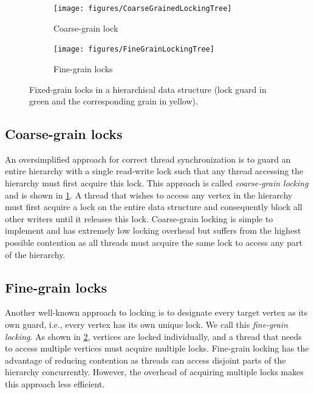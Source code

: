 \begin{figure}[H]
    \captionsetup{justification=centering}
    \centering
    \begin{subfigure}{.49\textwidth}
        \centering
        \texttt{[image: figures/CoarseGrainedLockingTree]}
        \caption{Coarse-grain lock}        
        \label{fig:fixedLockGrainsCoarse}
    \end{subfigure}
    \begin{subfigure}{.49\textwidth}
        \centering
        \texttt{[image: figures/FineGrainLockingTree]}
        \caption{Fine-grain locks}
        \label{fig:fixedLockGrainsFine}
    \end{subfigure}
    
    \label{fig:fixedLockGrains}
\caption{Fixed-grain locks in a hierarchical data structure (lock guard in green and the corresponding grain in yellow).}
\end{figure}


\subsection{Coarse-grain locks}
An oversimplified approach for correct thread synchronization is to guard an entire hierarchy with a single read-write lock such that any thread accessing the hierarchy must first acquire this lock.
This approach is called \emph{coarse-grain locking} and is shown in \cref{fig:fixedLockGrainsCoarse}.
A thread that wishes to access any vertex in the hierarchy must first acquire a lock on the entire data structure and consequently block all other writers until it releases this lock. 
Coarse-grain locking is simple to implement and has extremely low locking overhead but suffers from the highest possible contention as all threads must acquire the same lock to access any part of the hierarchy. 


\subsection{Fine-grain locks}
Another well-known approach to locking is to designate every target vertex as its own guard, i.e., every vertex has its own unique lock. 
We call this \emph{fine-grain locking}.
As shown in \cref{fig:fixedLockGrainsFine}, vertices are locked individually, and a thread that needs to access multiple vertices must acquire multiple locks. 
Fine-grain locking has the advantage of reducing contention as threads can access disjoint parts of the hierarchy concurrently. 
However, the overhead of acquiring multiple locks makes this approach less efficient. 



